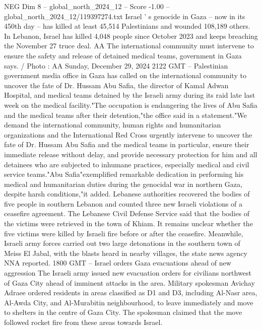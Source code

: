 \begin{textsample}{NEG Dim 8 – global\_north\_2024\_12 – Score -1.00 – global\_north\_2024\_12/119397274.txt}  \label{ex:f8_neg_118}
Israel ' s genocide in Gaza -- now in its 450th day -- has killed at least 45,514 Palestinians and wounded 108,189 others.
In Lebanon, Israel has killed 4,048 people since October 2023 and keeps breaching the November 27 truce deal.
AA The international community must intervene to ensure the safety and release of detained medical teams, government in Gaza says. / Photo : AA Sunday, December 29, 2024 2122 GMT -- Palestinian government media office in Gaza has called on the international community to uncover the fate of Dr.
Hussam Abu Safia, the director of Kamal Adwan Hospital, and medical teams detained by the Israeli army during its raid late last week on the medical facility."The occupation is endangering the lives of Abu Safia and the medical teams after their detention,"the office said in a statement."We demand the international community, human rights and humanitarian organizations and the International Red Cross urgently intervene to uncover the fate of Dr.
Hussam Abu Safia and the medical teams in particular, ensure their immediate release without delay, and provide necessary protection for him and all detainees who are subjected to inhumane practices, especially medical and civil service teams."Abu Safia"exemplified remarkable dedication in performing his medical and humanitarian duties during the genocidal war in northern Gaza, despite harsh conditions,"it added.
Lebanese authorities recovered the bodies of five people in southern Lebanon and counted three new Israeli violations of a ceasefire agreement.
The Lebanese Civil Defense Service said that the bodies of the victims were retrieved in the town of Khiam.
It remains unclear whether the five victims were killed by Israeli fire before or after the ceasefire.
Meanwhile, Israeli army forces carried out two large detonations in the southern town of Meiss El Jabal, with the blasts heard in nearby villages, the state news agency NNA reported. 1800 GMT -- Israel orders Gaza evacuations ahead of new aggression The Israeli army issued new evacuation orders for civilians northwest of Gaza City ahead of imminent attacks in the area.
Military spokesman Avichay Adraee ordered residents in areas classified as D1 and D3, including Al-Nasr area, Al-Awda City, and Al-Murabitin neighbourhood, to leave immediately and move to shelters in the centre of Gaza City.
The spokesman claimed that the move followed rocket fire from these areas towards Israel.

\end{textsample}
